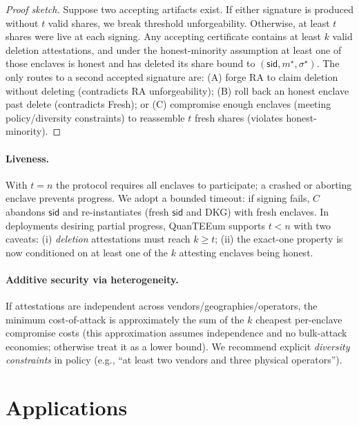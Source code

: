 \documentclass[runningheads,orivec]{llncs}
\newcommand{\prot}{\textsf{QuanTEEum}}
\newcommand{\sid}{\mathsf{sid}}
\begin{document}
\begin{proof}[Proof sketch]
Suppose two accepting artifacts exist. If either signature is produced without $t$ valid shares, we break threshold unforgeability. Otherwise, at least $t$ shares were live at each signing. Any accepting certificate contains at least $k$ valid deletion attestations, and under the honest-minority assumption at least one of those enclaves is honest and has deleted its share bound to $(\mathsf{sid},m^{\star},\sigma^{\star})$. The only routes to a second accepted signature are: (A) forge RA to claim deletion without deleting (contradicts RA unforgeability); (B) roll back an honest enclave past delete (contradicts \textsf{Fresh}); or (C) compromise enough enclaves (meeting policy/diversity constraints) to reassemble $t$ fresh shares (violates honest-minority).
\end{proof}

\paragraph{Liveness.}
With $t{=}n$ the protocol requires all enclaves to participate; a crashed or aborting enclave prevents progress. We adopt a bounded timeout: if signing fails, $C$ abandons $\sid$ and re-instantiates (fresh $\sid$ and DKG) with fresh enclaves. In deployments desiring partial progress, \prot{} supports $t<n$ with two caveats: (i) \emph{deletion} attestations must reach $k\!\ge\!t$; (ii) the exact-one property is now conditioned on at least one of the $k$ attesting enclaves being honest.

\paragraph{Additive security via heterogeneity.}
If attestations are independent across vendors/geographies/operators, the minimum cost\mbox{-}of\mbox{-}attack is approximately the sum of the $k$ cheapest per\mbox{-}enclave compromise costs (this approximation assumes independence and no bulk\mbox{-}attack economies; otherwise treat it as a lower bound). We recommend explicit \emph{diversity constraints} in policy (e.g., “at least two vendors and three physical operators”).

\section{Applications}\label{sec:apps}
\end{document}
